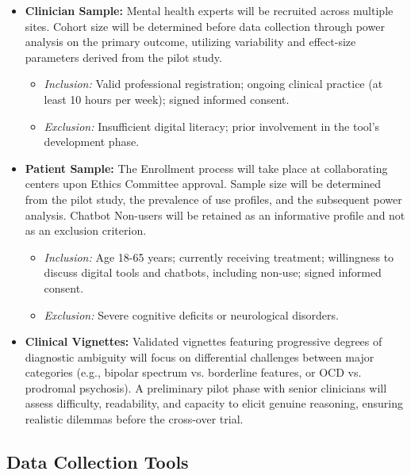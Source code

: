 \documentclass[11pt,a4paper]{article}
\begin{document}
\begin{itemize}
    \item \textbf{Clinician Sample:} Mental health experts will be recruited across multiple sites. Cohort size will be determined before data collection through power analysis on the primary outcome, utilizing  variability and effect-size parameters derived from the pilot study.
    \begin{itemize}
        \item \textit{Inclusion:} Valid professional registration; ongoing clinical practice (at least 10 hours per week); signed informed consent.
        \item \textit{Exclusion:} Insufficient digital literacy; prior involvement in the tool's development phase.
    \end{itemize}
    \item \textbf{Patient Sample:} The Enrollment process will take place at collaborating centers upon Ethics Committee approval. Sample size will be determined from the pilot study, the prevalence of use profiles, and the subsequent power analysis. Chatbot Non-users will be retained as an informative profile and not as an exclusion criterion.
    \begin{itemize}
        \item \textit{Inclusion:} Age 18-65 years; currently receiving treatment; willingness to discuss digital tools and chatbots, including non-use; signed informed consent.
        \item \textit{Exclusion:} Severe cognitive deficits or neurological disorders.
    \end{itemize}
    \item \textbf{Clinical Vignettes:} Validated vignettes featuring progressive degrees of diagnostic ambiguity will focus on differential challenges between major categories (e.g., bipolar spectrum vs. borderline features, or OCD vs. prodromal psychosis). A preliminary pilot phase with senior clinicians will assess difficulty, readability, and capacity to elicit genuine reasoning, ensuring realistic dilemmas before the cross-over trial.
\end{itemize}

\subsection{Data Collection Tools}
\end{document}
